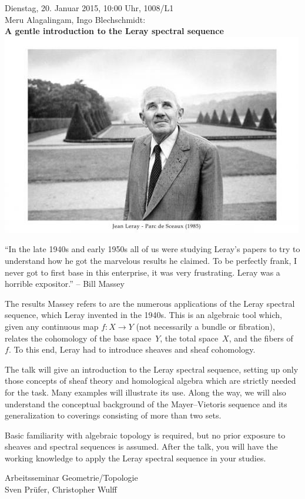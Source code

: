 \documentclass[a4paper,english]{scrartcl}
\begin{document}
\begin{center}
  \huge
  Dienstag, 20. Januar 2015, 10:00 Uhr, 1008/L1 \\[0.5em]
  Meru Alagalingam, Ingo Blechschmidt: \\
  \textbf{A gentle introduction to the Leray spectral sequence}
  \vfill
  \includegraphics[scale=0.9]{photos/leray}
  \vfill

  \Large
  \begin{minipage}{0.89\textwidth}
    \setlength\parskip{\medskipamount}
    \vspace{0.3em}
    ``In the late 1940s and early 1950s all of us were studying Leray’s papers to
    try to understand how he got the marvelous results he claimed. To be perfectly
    frank, I never got to first base in this enterprise, it was very frustrating.
    Leray was a horrible expositor.'' -- Bill Massey

    The results Massey refers to are the numerous applications of the Leray
    spectral sequence, which Leray invented in the 1940s. This is an algebraic tool
    which, given any continuous map $f : X \to Y$ (not necessarily a bundle or
    fibration), relates the cohomology of the base space~$Y$, the total space~$X$,
    and the fibers of~$f$. To this end, Leray had to introduce sheaves and sheaf
    cohomology.

    The talk will give an introduction to the Leray spectral sequence, setting up
    only those concepts of sheaf theory and homological algebra which are strictly
    needed for the task. Many examples will illustrate its use. Along the way, we
    will also understand the conceptual background of the Mayer--Vietoris sequence
    and its generalization to coverings consisting of more than two sets.

    Basic familiarity with algebraic topology is required, but no prior exposure to
    sheaves and spectral sequences is assumed. After the talk, you will have the
    working knowledge to apply the Leray spectral sequence in your studies.
  \end{minipage}

  \vfill
  \small
  Arbeitsseminar Geometrie/Topologie \\
  Sven Prüfer, Christopher Wulff
\end{center}
\end{document}
